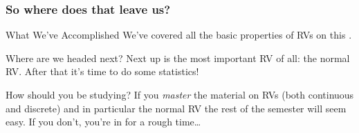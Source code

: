 %
%
%
%
\begin{frame}
  \frametitle{So where does that leave us?}

  \begin{block}{What We've Accomplished}
    We've covered all the basic properties of RVs on this \href{http://ditraglia.com/Econ103Public/RandomVariablesHandout.pdf}{\textcolor{blue}{}}.
  \end{block}

  \begin{block}{Where are we headed next?}
   Next up is the most important RV of all: the normal RV. 
   After that it's time to do some statistics!
  \end{block}

  \begin{alertblock}{How should you be studying?}
    If you \emph{master} the material on RVs (both continuous and discrete) and in particular the normal RV the rest of the semester will seem easy. 
    If you don't, you're in for a rough time\dots
  \end{alertblock}


\end{frame}
